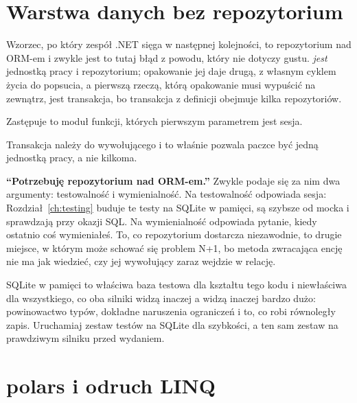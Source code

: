 \section{Warstwa danych bez repozytorium}
\label{sec:ch10-no-repository}

Wzorzec, po który zespół .NET sięga w następnej kolejności, to repozytorium
nad ORM-em \dash{} i zwykle jest to tutaj błąd z powodu, który nie dotyczy
gustu.  \emph{jest} jednostką pracy i repozytorium; opakowanie
jej daje drugą, z własnym cyklem życia do popsucia, a pierwszą rzeczą, którą
opakowanie musi wypuścić na zewnątrz, jest transakcja, bo transakcja z
definicji obejmuje kilka repozytoriów.

Zastępuje to moduł funkcji, których pierwszym parametrem jest sesja.


\noindent
Transakcja należy do wywołującego \dash{} i to właśnie pozwala paczce być
jedną jednostką pracy, a nie kilkoma.


\begin{trapbox}
\textbf{\enquote{Potrzebuję repozytorium nad ORM-em.}} Zwykle podaje się za
nim dwa argumenty: testowalność i wymienialność. Na testowalność odpowiada
sesja: Rozdział~\ref{ch:testing} buduje te testy na SQLite w pamięci, są
szybsze od mocka i sprawdzają przy okazji SQL. Na wymienialność odpowiada
pytanie, kiedy ostatnio coś wymieniałeś. To, co repozytorium dostarcza
niezawodnie, to drugie miejsce, w którym może schować się problem N+1, bo
metoda zwracająca encję nie ma jak wiedzieć, czy jej wywołujący zaraz wejdzie
w relację.
\end{trapbox}

\begin{note}
SQLite w pamięci to właściwa baza testowa dla kształtu tego kodu i
niewłaściwa dla wszystkiego, co oba silniki widzą inaczej \dash{} a widzą
inaczej bardzo dużo: powinowactwo typów, dokładne naruszenia ograniczeń i
to, co robi równoległy zapis. Uruchamiaj zestaw testów na SQLite dla
szybkości, a ten sam zestaw na prawdziwym silniku przed wydaniem.
\end{note}

\section{polars i odruch LINQ}
\label{sec:ch10-polars}

